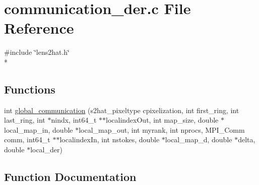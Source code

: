 \section{communication\-\_\-der.\-c File Reference}
\label{rng_2derivatives_2communication__der_8c}
{\ttfamily \#include \char`\"{}lens2hat.\-h\char`\"{}}\\*
\subsection*{Functions}
\begin{DoxyCompactItemize}
\item 
int \hyperlink{rng_2derivatives_2communication__der_8c_a746636033c41a3cc98ac1eaa18476a04}{global\-\_\-communication} (s2hat\-\_\-pixeltype cpixelization, int first\-\_\-ring, int last\-\_\-ring, int $\ast$nindx, int64\-\_\-t $\ast$$\ast$localindex\-Out, int map\-\_\-size, double $\ast$local\-\_\-map\-\_\-in, double $\ast$local\-\_\-map\-\_\-out, int myrank, int nprocs, M\-P\-I\-\_\-\-Comm comm, int64\-\_\-t $\ast$$\ast$localindex\-In, int nstokes, double $\ast$local\-\_\-map\-\_\-d, double $\ast$delta, double $\ast$local\-\_\-der)
\end{DoxyCompactItemize}


\subsection{Function Documentation}
